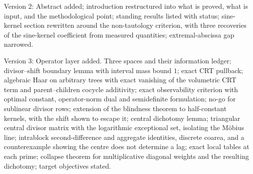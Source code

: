 \documentclass[11pt]{amsart}
\numberwithin{equation}{section}
\theoremstyle{plain}
\theoremstyle{definition}
\theoremstyle{remark}
\begin{document}
Version 2:
Abstract added; introduction restructured into what is proved, what is
input, and the methodological point; standing results listed with status;
sine-kernel section rewritten around the non-tautology criterion, with
three recoveries of the sine-kernel coefficient from measured
quantities; extremal-abscissa gap narrowed.

Version 3:
Operator layer added. Three spaces and their information ledger;
divisor--shift boundary lemma with interval mass bound $1$; exact CRT
pullback; algebraic Haar on arbitrary trees with exact vanishing of the
volumetric CRT term and parent--children cocycle additivity; exact
observability criterion with optimal constant, operator-norm dual and
semidefinite formulation; no-go for sublinear divisor rows; extension of
the blindness theorem to half-constant kernels, with the shift shown to
escape it; central dichotomy lemma; triangular central divisor matrix
with the logarithmic exceptional set, isolating the M\"obius line;
intrablock second-difference and aggregate identities, discrete coarea,
and a counterexample showing the centre does not determine a lag; exact
local tables at each prime; collapse theorem for multiplicative diagonal
weights and the resulting dichotomy; target objectives stated.
\end{document}
